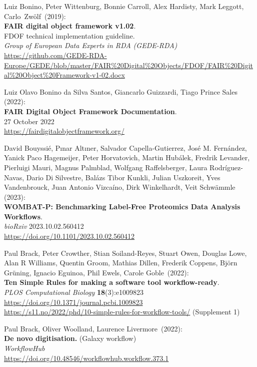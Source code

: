 \begin{thebibliography}{9}
Luiz Bonino, Peter Wittenburg, Bonnie Carroll, Alex
Hardisty, Mark Leggott, Carlo~Zwölf~(2019):\\
\textbf{FAIR digital object framework v1.02}.\\
FDOF technical implementation guideline.\\
\emph{Group of European Data Experts in RDA (GEDE-RDA)}\\
\url{https://github.com/GEDE-RDA-Europe/GEDE/blob/master/FAIR\%20Digital\%20Objects/FDOF/FAIR\%20Digital\%20Object\%20Framework-v1-02.docx}

Luiz Olavo Bonino da Silva Santos, Giancarlo Guizzardi, Tiago Prince Sales (2022): \\
\textbf{FAIR Digital Object Framework Documentation}. \\
27 October 2022\\
\url{https://fairdigitalobjectframework.org/}

David Bouyssié, Pınar Altıner, Salvador Capella-Gutierrez, José M. Fernández, Yanick Paco Hagemeijer, Peter Horvatovich, Martin Hubálek, Fredrik Levander, Pierluigi Mauri, Magnus Palmblad, Wolfgang Raffelsberger, Laura Rodríguez-Navas, Dario Di Silvestre, Balázs Tibor Kunkli, Julian Uszkoreit, Yves Vandenbrouck, Juan Antonio Vizcaíno, Dirk Winkelhardt, Veit Schwämmle (2023):\\
\textbf{WOMBAT-P: Benchmarking Label-Free Proteomics Data Analysis Workflows}.\\
\emph{bioRxiv} 2023.10.02.560412 \\
\url{https://doi.org/10.1101/2023.10.02.560412}


Paul Brack, Peter Crowther, Stian Soiland-Reyes, Stuart Owen,
Douglas Lowe, Alan R Williams, Quentin Groom, Mathias Dillen, Frederik
Coppens, Björn Grüning, Ignacio Eguinoa, Phil Ewels, Carole Goble~(2022):\\
\textbf{Ten Simple Rules for making a software tool workflow-ready}.\\
\emph{PLOS Computational Biology} \textbf{18}(3):e1009823\\
\url{https://doi.org/10.1371/journal.pcbi.1009823}\\
\url{https://s11.no/2022/phd/10-simple-rules-for-workflow-tools/}
(Supplement 1)

Paul Brack, Oliver Woolland, Laurence Livermore~(2022):\\
\textbf{De novo digitisation.} (Galaxy workflow)\\
\emph{WorkflowHub}\\
\url{https://doi.org/10.48546/workflowhub.workflow.373.1}


\end{thebibliography}
